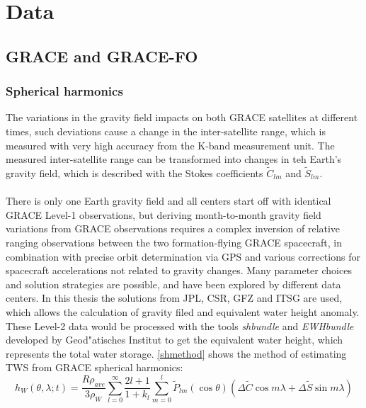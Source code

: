 \chapter{Data}
\section{GRACE and GRACE-FO}
\subsection{Spherical harmonics}
The variations in the gravity field impacts on both GRACE satellites at different times, such deviations cause a change in the inter-satellite range, which is measured with very high accuracy from the K-band measurement unit. The measured inter-satellite range can be transformed into changes in teh Earth's gravity field, which is described with the Stokes coefficients $\tilde{C}_{lm}$ and $\tilde{S}_{lm}$.\\\\
There is only one Earth gravity field and all centers start off with identical GRACE Level-1 observations, but deriving month-to-month gravity field variations from GRACE observations requires a complex inversion of relative ranging observations between the two formation-flying GRACE spacecraft, in combination with precise orbit determination via GPS and various corrections for spacecraft accelerations not related to gravity changes. Many parameter choices and solution strategies are possible, and have been explored by different data centers. In this thesis the solutions from JPL, CSR, GFZ and ITSG are used, which allows the calculation of gravity filed and equivalent water height anomaly. These Level-2 data would be processed with the tools \textit{shbundle} and \textit{EWHbundle} developed by Geod"atisches Institut to get the equivalent water height, which represents the total water storage. \autoref{shmethod} shows the method of estimating TWS from GRACE spherical harmonics: 
\begin{equation}
h_{W}(\theta,\lambda;t) = \frac{R \rho_{ave}}{3\rho_{W}} \sum_{l=0}^{\infty} \frac{2l+1}{1+k_{l}} \sum_{m=0}^{l} \tilde{P}_{lm} (\cos \theta) (\Delta \tilde{C} \cos m \lambda + \Delta \tilde{S} \sin m \lambda)
\end{equation}
